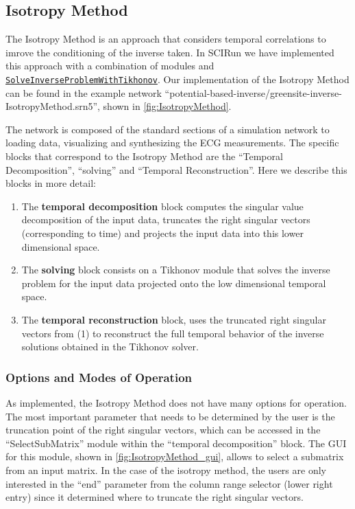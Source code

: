 

\subsection{Isotropy Method}

    The Isotropy Method is an approach that considers temporal correlations to imrove the conditioning of the inverse taken.
    In SCIRun we have implemented this approach with a combination of modules and \href{http://scirundocwiki.sci.utah.edu/SCIRunDocs/index.php/CIBC:Documentation:SCIRun:Reference:BioPSE:SolveInverseProblemWithTikhonov}{{\tt SolveInverseProblemWithTikhonov}}.
    Our implementation of the Isotropy Method can be found in the example network ``potential-based-inverse/greensite-inverse-IsotropyMethod.srn5'', shown in \autoref{fig:IsotropyMethod}.

    The network is composed of the standard sections of a simulation network to loading data, visualizing and synthesizing the ECG measurements.
    The specific blocks that correspond to the Isotropy Method are the ``Temporal Decomposition'', ``solving'' and ``Temporal Reconstruction''. Here we describe this blocks in more detail:
    \begin{enumerate}
        \item The {\bf temporal decomposition} block computes the singular value decomposition of the input data, truncates the right singular vectors (corresponding to time) and projects the input data into this lower dimensional space.
        \item The {\bf solving } block consists on a Tikhonov module that solves the inverse problem for the input data projected onto the low dimensional temporal space.
        \item The {\bf temporal reconstruction} block, uses the truncated right singular vectors from (1) to reconstruct the full temporal behavior of the inverse solutions obtained in the Tikhonov solver.
    \end{enumerate}

    \subsubsection{Options and Modes of Operation}

    As implemented, the Isotropy Method does not have many options for operation. The most important parameter that needs to be determined by the user is the truncation point of the right singular vectors, which can be accessed in the ``SelectSubMatrix'' module within the ``temporal decomposition'' block.
    The GUI for this module, shown in \autoref{fig:IsotropyMethod_gui}, allows to select a submatrix from an input matrix. In the case of the isotropy method, the users are only interested in the ``end'' parameter from the column range selector (lower right entry) since it determined where to truncate the right singular vectors.

